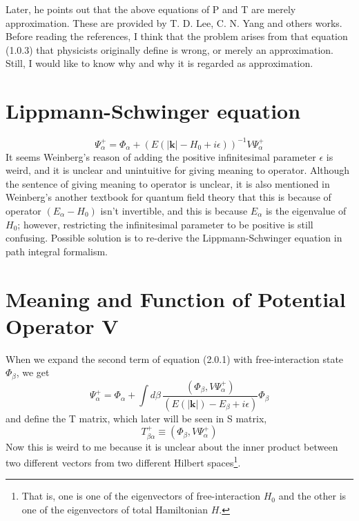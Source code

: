 \documentclass[12pt]{article}
\numberwithin{equation}{subsection}
\begin{document}
Later, he points out that the above equations of P and T are merely approximation.
These are provided by T. D. Lee, C. N. Yang and others works\cite{PhysRev.104.254}\cite{PhysRevLett.13.138}. 
Before reading the references, I think that the problem arises from that equation (1.0.3) that physicists originally define is wrong, or merely an approximation.
Still, I would like to know why and why it is regarded as approximation.
\section{Lippmann-Schwinger equation}
\begin{equation}
    \Psi_{\alpha}^{+} = \Phi_{\alpha}+\left(E(|\mathbf{k}|-H_{0}+i\epsilon)\right)^{-1}V\Psi_{\alpha}^{+}
\end{equation}
It seems Weinberg's reason\cite{Weinberg_2015} of adding the positive infinitesimal parameter $\epsilon$ is weird, and it is unclear and unintuitive for giving meaning to operator.
Although the sentence of giving meaning to operator is unclear, it is also mentioned in Weinberg's another textbook for quantum field theory\cite{Weinberg_1995_3} that this is because of operator $(E_{\alpha}-H_0)$ isn't invertible, and this is because $E_{\alpha}$ is the eigenvalue of $H_0$; however, restricting the infinitesimal parameter to be positive is still confusing.
Possible solution is to re-derive the Lippmann-Schwinger equation\cite{PhysRev.79.469} in path integral formalism.
\section{Meaning and Function of Potential Operator V}
When we expand the second term of equation (2.0.1) with free-interaction state $\Phi_{\beta}$, we get
\begin{equation}
    \Psi_{\alpha}^{+} = \Phi_{\alpha} + \int{d\beta\,\frac{(\Phi_{\beta}, V\Psi_{\alpha}^{+})}{(E(|\mathbf{k}|)-E_{\beta}+i\epsilon)}\Phi_{\beta}}
\end{equation}
and define the T matrix, which later will be seen in S matrix,
\begin{equation}
    T_{\beta\alpha}^{+} \equiv (\Phi_{\beta}, V\Psi_{\alpha}^{+})
\end{equation}
Now this is weird to me because it is unclear about the inner product between two different vectors from two different Hilbert spaces\footnote{That is, one is one of the eigenvectors of free-interaction $H_0$ and the other is one of the eigenvectors of total Hamiltonian $H$.}.
\end{document}
